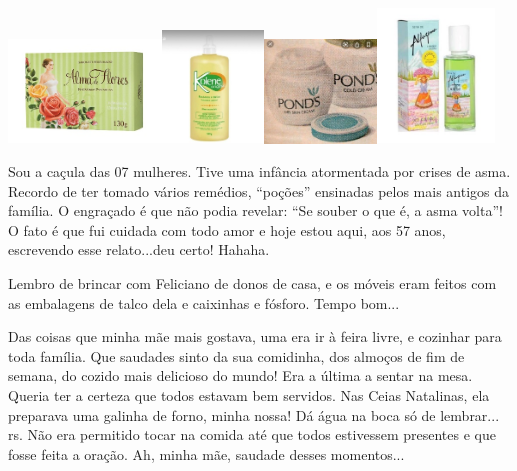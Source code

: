 \documentclass[
  brazil,
  a6paper,
  oneside,
  landscape,
  14pt]{scrbook}
\begin{document}
\includegraphics[width=1.60579in,height=1.08798in]{img/cristina/image1.jpeg}\includegraphics[width=1.06181in,height=1.18458in]{img/cristina/image2.jpeg}\includegraphics[width=1.175in,height=1.08773in]{img/cristina/image3.jpeg}\includegraphics[width=1.22708in,height=1.41164in]{img/cristina/image4.jpeg}

Sou a caçula das 07 mulheres. Tive uma infância atormentada por crises
de asma. Recordo de ter tomado vários remédios, ``poções'' ensinadas
pelos mais antigos da família. O engraçado é que não podia revelar: ``Se
souber o que é, a asma volta''! O fato é que fui cuidada com todo amor e
hoje estou aqui, aos 57 anos, escrevendo esse relato...deu certo!
Hahaha.

Lembro de brincar com Feliciano de donos de casa, e os móveis eram
feitos com as embalagens de talco dela e caixinhas e fósforo. Tempo
bom...

Das coisas que minha mãe mais gostava, uma era ir à feira livre, e
cozinhar para toda família. Que saudades sinto da sua comidinha, dos
almoços de fim de semana, do cozido mais delicioso do mundo! Era a
última a sentar na mesa. Queria ter a certeza que todos estavam bem
servidos. Nas Ceias Natalinas, ela preparava uma galinha de forno, minha
nossa! Dá água na boca só de lembrar... rs. Não era permitido tocar na
comida até que todos estivessem presentes e que fosse feita a oração.
Ah, minha mãe, saudade desses momentos...
\end{document}
